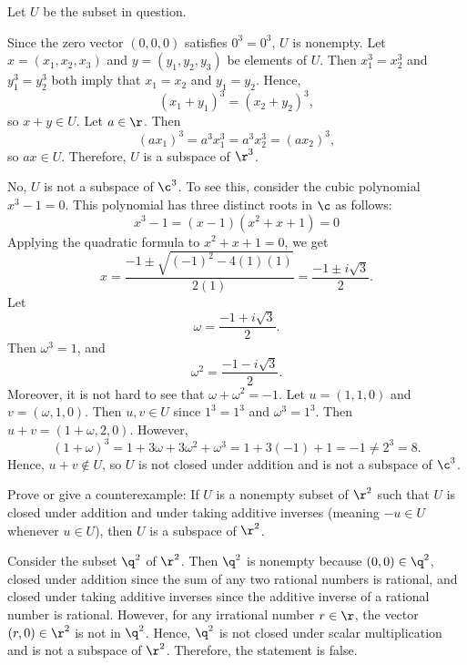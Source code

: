 \begin{sol}
    Let $U$ be the subset in question.
    \begin{subexercises}
        \item Since the zero vector $(0, 0, 0)$ satisfies $0^3 = 0^3$, $U$ is nonempty. Let $x = (x_1, x_2, x_3)$ and $y = (y_1, y_2, y_3)$ be elements of $U$. Then $x_1^3 = x_2^3$ and $y_1^3 = y_2^3$ both imply that $x_1 = x_2$ and $y_1 = y_2$. Hence,
        \[(x_1 + y_1)^3 = (x_2 + y_2)^3,\]
        so $x + y \in U$. Let $a \in \r$. Then
        \[(ax_1)^3 = a^3 x_1^3 = a^3 x_2^3 = (ax_2)^3,\]
        so $ax \in U$. Therefore, $U$ is a subspace of $\r^3$.
        \item No, $U$ is not a subspace of $\c^3$. To see this, consider the cubic polynomial $x^3 - 1 = 0$. This polynomial has three distinct roots in $\c$ as follows:
        \[x^3 - 1 = (x - 1)(x^2 + x + 1) = 0\]
        Applying the quadratic formula to $x^2 + x + 1 = 0$, we get
        \[x = \frac{-1 \pm \sqrt{(-1)^2 - 4(1)(1)}}{2(1)} = \frac{-1 \pm i\sqrt{3}}{2}.\]
        Let
        \[\omega = \frac{-1 + i\sqrt{3}}{2}.\]
        Then $\omega^3 = 1$, and
        \[\omega^2 = \frac{-1 - i\sqrt{3}}{2}.\]
        Moreover, it is not hard to see that $\omega + \omega^2 = -1$. Let $u = (1, 1, 0)$ and $v = (\omega, 1, 0)$. Then $u, v \in U$ since $1^3 = 1^3$ and $\omega^3 = 1^3$. Then $u + v = (1 + \omega, 2, 0)$. However,
        \[(1 + \omega)^3 = 1 + 3\omega + 3\omega^2 + \omega^3 = 1 + 3(-1) + 1 = -1 \neq 2^3 = 8.\]
        Hence, $u + v \notin U$, so $U$ is not closed under addition and is not a subspace of $\c^3$. \qh
    \end{subexercises}
\end{sol}

\begin{exercise}[1c7]
    Prove or give a counterexample: If $U$ is a nonempty subset of $\r^2$ such that $U$ is closed under addition and under taking additive inverses (meaning $-u \in U$ whenever $u \in U$), then $U$ is a subspace of $\r^2$.
\end{exercise}

\begin{sol}
    Consider the subset $\q^2$ of $\r^2$. Then $\q^2$ is nonempty because $(0, 0) \in \q^2$, closed under addition since the sum of any two rational numbers is rational, and closed under taking additive inverses since the additive inverse of a rational number is rational. However, for any irrational number $r \in \r$, the vector $(r, 0) \in \r^2$ is not in $\q^2$. Hence, $\q^2$ is not closed under scalar multiplication and is not a subspace of $\r^2$. Therefore, the statement is false.
\end{sol}

